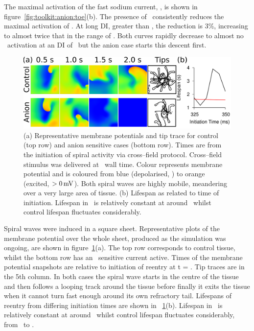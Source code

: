 The maximal activation of the fast sodium current, , is shown in
figure~\ref{fig:toolkit:anion:toe}(b).
The presence of \ consistently reduces the maximal activation of .
At long DI, greater than , the reduction is 3\%, increasing to almost
twice that in the range of .
Both curves rapidly decrease to almost no \ activation at an DI of
\ but the anion case starts this descent first.
\begin{figure}
\begin{center}
\includegraphics{figures/toolkit/anion/twod_traces}
\end{center}
\caption[Anion Sensitive Tissue Sheets and Spiral Lifespands]{
\label{fig:toolkit:anion:spiral}
(a)
Representative membrane potentials and tip trace for control (top row) and anion
sensitive cases (bottom row).
Times are from the initiation of spiral activity via cross--field protocol.
Cross--field stimulus was delivered at \ wall time.
Colour represents membrane potential and is coloured from blue (depolarised,
) to orange (excited, $>0\,\text{mV}$).
Both spiral waves are highly mobile, meandering over a very large area of
tissue.
(b)
Lifespan as related to time of initiation.
Lifespan in \ is relatively constant at around \ whilst
control lifespan fluctuates considerably.
}
\end{figure}
Spiral waves were induced in a square sheet.
Representative plots of the
membrane potential over the whole sheet, produced as the simulation was ongoing,
are shown in figure~\ref{fig:toolkit:anion:spiral}(a).
The top row corresponds to control tissue, whilst the bottom row has an
\ sensitive current active.
Times of the membrane potential snapshots are relative to initiation of reentry at t = .
Tip traces are in the 5th column.
In both cases the spiral wave starts in the centre of the tissue and then follows a
looping track around the tissue before finally it exits the tissue when it
cannot turn fast enough around its own refractory tail.
Lifespans of reentry from differing initiation times are shown in
~\ref{fig:toolkit:anion:spiral}(b).
Lifespan in \ is relatively constant at around \ whilst
control lifespan fluctuates considerably, from \ to .

